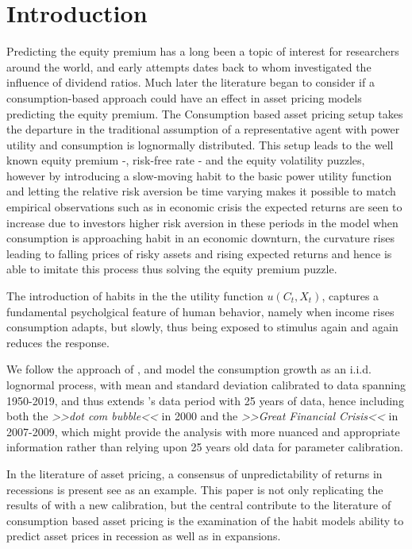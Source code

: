 \section{Introduction} \label{sec:Introduction}

Predicting the equity premium has a long been a topic of interest for researchers around the world, and early attempts dates back to \cite{Dow1920} whom investigated the influence of dividend ratios. Much later the literature began to consider if a consumption-based approach could have an effect in asset pricing models predicting the equity premium. The Consumption based asset pricing setup takes the departure in the traditional assumption of a representative agent with power utility and consumption is lognormally distributed. This setup leads to the well known equity premium -, risk-free rate - and the equity volatility puzzles, however by introducing a slow-moving habit to the basic power utility function \cite{Campbell1999} and letting the relative risk aversion be time varying makes it possible to match empirical observations such as in economic crisis the expected returns are seen to increase due to investors higher risk aversion in these periods in the model when consumption is approaching habit in an economic downturn, the curvature rises leading to falling prices of risky assets and rising expected returns and hence is able to imitate this process thus solving the equity premium puzzle. 


The introduction of habits in the the utility function $u \left(C_t, X_t \right)$, captures a fundamental psycholgical feature of human behavior, namely when income rises consumption adapts, but slowly, thus being exposed to stimulus again and again reduces the response.

We follow the approach of \cite{Campbell1999}, and model the consumption growth as an i.i.d. lognormal process, with mean and standard deviation calibrated to data spanning 1950-2019, and thus extends \cite{Campbell1999}'s data period with 25 years of data, hence including both the \textit{>>dot com bubble<<} in 2000 and the \textit{>>Great Financial Crisis<<} in 2007-2009, which might provide the analysis with more nuanced and appropriate information rather than relying upon 25 years old data for parameter calibration.


In the literature of asset pricing, a consensus of unpredictability of returns in recessions is present see \cite{Henkel2011} as an example. This paper is not only replicating the results of \cite{Campbell1999} with a new calibration, but the central contribute to the literature of consumption based asset pricing is the examination of the \cite{Campbell1999} habit models ability to predict asset prices in recession as well as in expansions.

